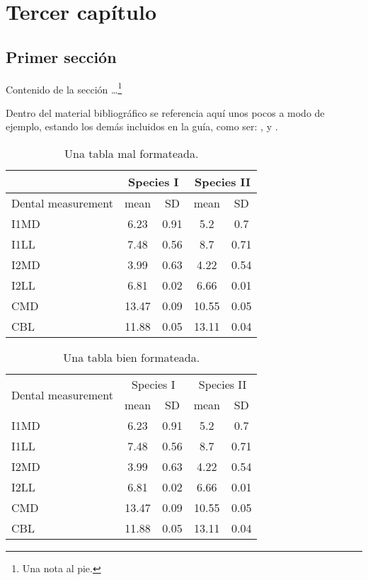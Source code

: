 
\chapter{Tercer capítulo}

\section{Primer sección}
Contenido de la sección \dots \footnote{Una nota al pie.}

Dentro del material bibliográfico se referencia aquí unos pocos a modo de ejemplo, estando los demás incluidos en la guía, como ser: \cite{book-example}, \cite{techreport-example} y \cite{article-example}.

\begin{table}[h]
	\caption{Una tabla mal formateada.}
	\centering
	\label{table:bad_table}
	\begin{tabular}{|l|c|c|c|c|}
	\hline & \multicolumn{2}{c}{Species I} & \multicolumn{2}{c|}{Species II} \\ 
	\hline  Dental measurement  & mean & SD  & mean & SD  \\ \hline 
	\hline	I1MD & 6.23 & 0.91 & 5.2  & 0.7  \\
	\hline 	I1LL & 7.48 & 0.56 & 8.7  & 0.71 \\
	\hline 	I2MD & 3.99 & 0.63 & 4.22 & 0.54 \\
	\hline 	I2LL & 6.81 & 0.02 & 6.66 & 0.01 \\
	\hline 	CMD & 13.47 & 0.09 & 10.55 & 0.05 \\
	\hline 	CBL & 11.88 & 0.05 & 13.11 & 0.04\\ 
	\hline 
	\end{tabular}
\end{table}

\begin{table}[h]
	\caption{Una tabla bien formateada.}
	\centering
	\label{table:good_table}
	\begin{tabular}{l c c c c}
	\toprule
	\multirow{2}{*}{Dental measurement} & \multicolumn{2}{c}{Species I} & \multicolumn{2}{c}{Species II} \\ 
	\cmidrule{2-5}  & mean & SD  & mean & SD  \\ 
	\midrule
	I1MD & 6.23 & 0.91 & 5.2  & 0.7  \\
	I1LL & 7.48 & 0.56 & 8.7  & 0.71 \\	
	I2MD & 3.99 & 0.63 & 4.22 & 0.54 \\	
	I2LL & 6.81 & 0.02 & 6.66 & 0.01 \\	
	CMD & 13.47 & 0.09 & 10.55 & 0.05 \\	
	CBL & 11.88 & 0.05 & 13.11 & 0.04\\ 
	\bottomrule
	\end{tabular}
\end{table}
